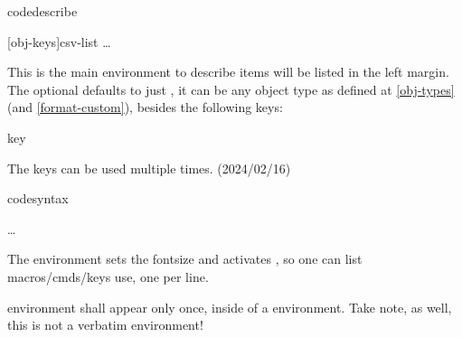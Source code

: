 \documentclass{article}
\begin{document}
\begin{codedescribe}[env,new=2023/05/01,update=2023/05/01,note={this is an example},update=2024/02/16]{codedescribe}
\begin{codesyntax}
\tsmacro{\begin{codedescribe}}[obj-keys]{csv-list}
\ldots
\tsmacro{\end{codedescribe}}{}
\end{codesyntax}
This is the main environment to describe   items will be listed  in the left margin. The optional  defaults to just , it can be any object type as defined at \ref{obj-types} (and \ref{format-custom}), besides the following keys:
\begin{describelist*}{key}
\end{describelist*}
\end{codedescribe}
\begin{tsremark}
The keys  can be used multiple times. (2024/02/16)
\end{tsremark}

\begin{codedescribe}[env]{codesyntax}
\begin{codesyntax}
\tsmacro{\begin{codesyntax}}{}
\ldots
\tsmacro{\end{codesyntax}}{}
\end{codesyntax}
The  environment sets the fontsize and activates \tsmacro{\obeylines,\obeyspaces}{}, so one can list macros/cmds/keys use, one per line.
\end{codedescribe}

\begin{tsremark*}
 environment shall appear only once, inside of a  environment. Take note, as well, this is not a verbatim environment!
\end{tsremark*}
\end{document}
